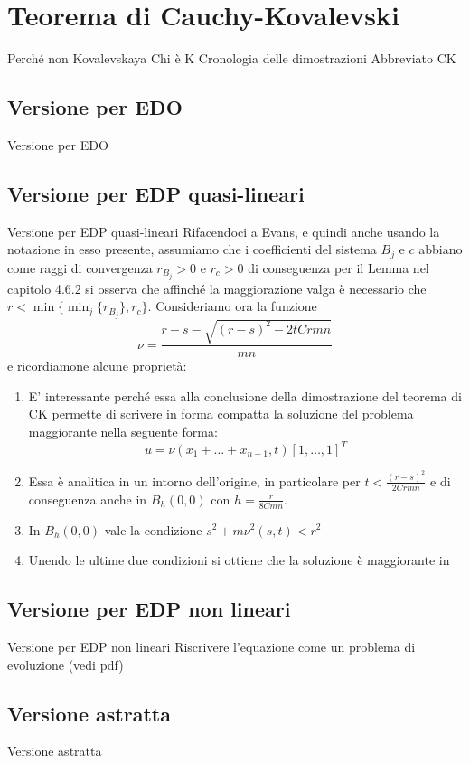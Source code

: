 \chapter{Teorema di Cauchy-Kovalevski}

Perché non Kovalevskaya
Chi è K
Cronologia delle dimostrazioni
Abbreviato CK
\section{Versione per EDO}
Versione per EDO
\section{Versione per EDP quasi-lineari}
Versione per EDP quasi-lineari
Rifacendoci a Evans, e quindi anche usando la notazione in esso presente, 
assumiamo che i coefficienti del sistema $B_j$ e $c$ abbiano come raggi di convergenza $r_{B_j}>0$ e $r_c>0$ 
di conseguenza per il Lemma nel capitolo 4.6.2 si osserva che affinché la maggiorazione valga è necessario 
che $r<\min\{\min_{j} \{r_{B_j}\}, r_c \}$.
Consideriamo ora la funzione $$\nu=\frac{r-s-\sqrt{(r-s)^2-2tCrmn}}{mn}$$ e ricordiamone alcune proprietà:
\begin{enumerate}[1.]

\item
E' interessante perché essa alla conclusione della dimostrazione del teorema di CK 
permette di scrivere in forma compatta la soluzione del problema maggiorante nella seguente forma: 
$$u = \nu(x_1+\ldots+x_{n-1}, t)[1,\ldots,1]^T$$

\item
Essa è analitica in un intorno dell'origine, in particolare per $t<\frac{(r-s)^2}{2Crmn}$ e di 
conseguenza anche in $B_h(0,0)$ con $h=\frac{r}{8Cmn}$.

\item
In $B_h(0,0)$ vale la condizione $s^2+m\nu ^2 (s,t)< r^2$

\item
Unendo le ultime due condizioni si ottiene che la soluzione è maggiorante in 

\end{enumerate}

\section{Versione per EDP non lineari}
Versione per EDP non lineari
Riscrivere l'equazione come un problema di evoluzione (vedi pdf)
\section{Versione astratta}
Versione astratta

